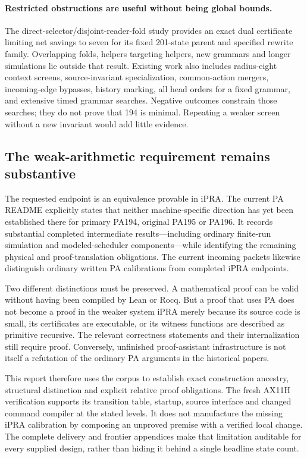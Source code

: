 \paragraph{Restricted obstructions are useful without being global bounds.}
The direct-selector/disjoint-reader-fold study provides an exact dual
certificate limiting net savings to seven for its fixed 201-state parent
and specified rewrite family.  Overlapping folds, helpers targeting helpers,
new grammars and longer simulations lie outside that result.  Existing
work also includes radius-eight context screens, source-invariant
specialization, common-action mergers, incoming-edge bypasses, history
marking, all head orders for a fixed grammar, and extensive timed grammar
searches.  Negative outcomes constrain those searches; they do not prove
that 194 is minimal.  Repeating a weaker screen without a new invariant
would add little evidence.

\subsection{The weak-arithmetic requirement remains substantive}
\label{cmp:proof-status}

The requested endpoint is an equivalence provable in iPRA.  The current
PA README explicitly states that neither machine-specific direction has
yet been established there for primary PA194, original PA195 or PA196.
It records substantial completed intermediate results---including ordinary
finite-run simulation and modeled-scheduler components---while identifying
the remaining physical and proof-translation obligations.
The current incoming packets likewise distinguish ordinary written PA
calibrations from completed iPRA endpoints.\cite{pa-readme,incoming}

Two different distinctions must be preserved.  A mathematical proof can
be valid without having been compiled by Lean or Rocq.  But a proof that
uses PA does not become a proof in the weaker system iPRA merely because
its source code is small, its certificates are executable, or its witness
functions are described as primitive recursive.  The relevant correctness
statements and their internalization still require proof.  Conversely,
unfinished proof-assistant infrastructure is not itself a refutation of
the ordinary PA arguments in the historical papers.

This report therefore uses the corpus to establish exact construction
ancestry, structural distinction and explicit relative proof obligations.
The fresh AX11H verification supports its transition table, startup,
source interface and changed command compiler at the stated levels.
It does not manufacture the missing iPRA calibration by composing an
unproved premise with a verified local change.  The complete delivery and
frontier appendices make that limitation auditable for every supplied
design, rather than hiding it behind a single headline state count.
